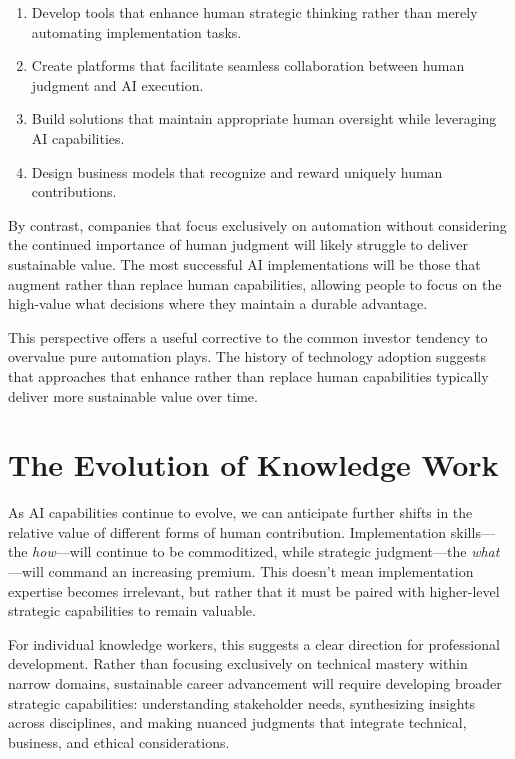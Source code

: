 \documentclass[
  Letterpaper,
]{scrbook}
\providecommand{\tightlist}{%
  \setlength{\itemsep}{0pt}\setlength{\parskip}{0pt}}\usepackage{longtable,booktabs,array}
\begin{document}
\begin{enumerate}
\def\labelenumi{\arabic{enumi}.}
\tightlist
\item
  Develop tools that enhance human strategic thinking rather than merely
  automating implementation tasks.
\item
  Create platforms that facilitate seamless collaboration between human
  judgment and AI execution.
\item
  Build solutions that maintain appropriate human oversight while
  leveraging AI capabilities.
\item
  Design business models that recognize and reward uniquely human
  contributions.
\end{enumerate}

By contrast, companies that focus exclusively on automation without
considering the continued importance of human judgment will likely
struggle to deliver sustainable value. The most successful AI
implementations will be those that augment rather than replace human
capabilities, allowing
people to focus on the high-value what decisions where they maintain a
durable advantage.

This perspective offers a useful corrective to the common investor
tendency to overvalue pure automation plays. The history of technology
adoption suggests that approaches that enhance rather than replace human
capabilities typically deliver more sustainable value over time.

\section{The Evolution of Knowledge
Work}\label{the-evolution-of-knowledge-work}

As AI capabilities continue to evolve, we can anticipate further shifts
in the relative value of different forms of human contribution.
Implementation skills---the \emph{how}---will continue to be
commoditized, while strategic judgment---the \emph{what}---will command
an increasing premium. This doesn't mean implementation expertise
becomes irrelevant, but rather that it must be paired with higher-level
strategic capabilities to remain valuable.

For individual knowledge workers, this suggests a clear direction for
professional development. Rather than focusing exclusively on technical
mastery within narrow domains, sustainable career advancement will
require developing broader strategic capabilities: understanding
stakeholder needs, synthesizing insights across disciplines, and making
nuanced judgments that integrate technical, business, and ethical
considerations.
\end{document}
